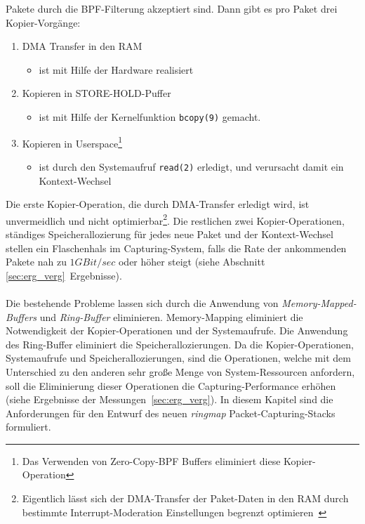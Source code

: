 Pakete durch die BPF-Filterung akzeptiert sind. Dann gibt es pro Paket drei
Kopier-Vorgänge:
\begin{enumerate}
\item DMA Transfer in den RAM
	\begin{itemize}
		\item ist mit Hilfe der Hardware realisiert
	\end{itemize}
\item Kopieren in STORE-HOLD-Puffer
	\begin{itemize}
		\item ist mit Hilfe der Kernelfunktion \verb+bcopy(9)+ gemacht. 
	\end{itemize}
\item Kopieren in Userspace\footnote{Das Verwenden von Zero-Copy-BPF Buffers
eliminiert diese Kopier-Operation}
	\begin{itemize}
		\item ist durch den Systemaufruf \verb+read(2)+ erledigt, und verursacht damit
			ein Kontext-Wechsel
	\end{itemize}
\end{enumerate}
Die erste Kopier-Operation, die durch DMA-Transfer erledigt wird, ist
unvermeidlich und nicht optimierbar\footnote{Eigentlich lässt sich der
DMA-Transfer der Paket-Daten in den RAM durch bestimmte Interrupt-Moderation
Einstellungen begrenzt optimieren~\cite{intrr_mod, e1000_sdm}}. Die restlichen zwei
Kopier-Operationen, ständiges Speicherallozierung für jedes neue Paket und der
Kontext-Wechsel stellen ein Flaschenhals im Capturing-System, falls die Rate
der ankommenden Pakete nah zu $1GBit/sec$ oder höher steigt (siehe Abschnitt
\ref{sec:erg_verg}~Ergebnisse).\\\\
%
Die bestehende Probleme lassen sich durch die Anwendung von
\emph{Memory-Mapped-Buffers} und \emph{Ring-Buffer} eliminieren.
Memory-Mapping eliminiert die Notwendigkeit der Kopier-Operationen und der
Systemaufrufe.  Die Anwendung des Ring-Buffer eliminiert die
Speicherallozierungen. Da die Kopier-Operationen, Systemaufrufe und
Speicherallozierungen, sind die Operationen, welche mit dem Unterschied zu den
anderen sehr große Menge von System-Ressourcen anfordern, soll die Eliminierung
dieser Operationen die Capturing-Performance erhöhen (siehe Ergebnisse der 
Messungen~\ref{sec:erg_verg}).
\newpage
{}
In diesem Kapitel sind die Anforderungen für den Entwurf des neuen \emph{ringmap}
Packet-Capturing-Stacks formuliert. 
